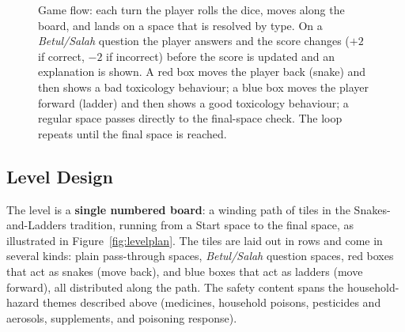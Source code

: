 \documentclass[a4paper,12pt]{article}
\begin{document}
\begin{figure}[H]
\caption{Game flow: each turn the player rolls the dice, moves along the board, and lands on a space that is resolved by type. On a \emph{Betul/Salah} question the player answers and the score changes ($+2$ if correct, $-2$ if incorrect) before the score is updated and an explanation is shown. A red box moves the player back (snake) and then shows a bad toxicology behaviour; a blue box moves the player forward (ladder) and then shows a good toxicology behaviour; a regular space passes directly to the final-space check. The loop repeats until the final space is reached.}
\label{fig:gameflow}
\end{figure}

\subsection{Level Design}
\label{sec:level-design}

The level is a \textbf{single numbered board}: a winding path of tiles in the Snakes-and-Ladders tradition, running from a Start space to the final space, as illustrated in Figure~\ref{fig:levelplan}. The tiles are laid out in rows and come in several kinds: plain pass-through spaces, \emph{Betul/Salah} question spaces, red boxes that act as snakes (move back), and blue boxes that act as ladders (move forward), all distributed along the path. The safety content spans the household-hazard themes described above (medicines, household poisons, pesticides and aerosols, supplements, and poisoning response).
\end{document}

